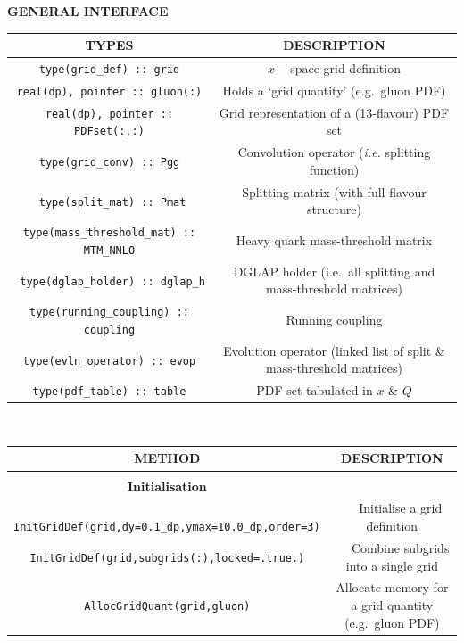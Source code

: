\documentclass[12pt]{article}
\newcommand{\eg}{e.g.\ }
\newcommand{\ie}{i.e.\ }
\begin{document}
\begin{table}
\scriptsize
\begin{center}
{\bf \large GENERAL INTERFACE} \\
\vspace{0.5cm} 
\begin{tabular}{|c|c|}
\hline
\bf TYPES  & \bf DESCRIPTION \\
\hline
\texttt{type(grid\_def) :: grid} & $x-$space grid definition \\ 
\hline
\texttt{real(dp), pointer :: gluon(:)} & Holds a 
`grid quantity' (\eg gluon PDF) \\
\hline
\texttt{real(dp), pointer :: PDFset(:,:)} & 
Grid representation of a (13-flavour) PDF set \\
\hline
\texttt{type(grid\_conv) :: Pgg} 
 & Convolution operator ({\it i.e.} splitting function) \\ 
\hline
\texttt{ type(split\_mat) :: Pmat}
 & Splitting matrix (with full flavour structure)\\ 
\hline
 \texttt{type(mass\_threshold\_mat) :: MTM\_NNLO}
 & Heavy quark mass-threshold matrix\\ 
\hline
\texttt{ type(dglap\_holder) :: dglap\_h} & DGLAP holder (\ie all
splitting and mass-threshold matrices) \\
\hline
\texttt{type(running\_coupling) :: coupling} & Running coupling \\
\hline
\texttt{type(evln\_operator) :: evop} & Evolution operator (linked
list of split \& mass-threshold matrices)\\
\hline
\texttt{type(pdf\_table) :: table} & PDF set tabulated in $x$ \& $Q$\\
\hline
\end{tabular}
\vspace{0.7cm}\\
\begin{tabular}{|c|c|}
\hline
\bf METHOD  & \bf DESCRIPTION \\
\hline &\\[-0.5em]
\bf Initialisation & \\[0.3em]
\hline
\texttt{
 InitGridDef(grid,dy=0.1\_dp,ymax=10.0\_dp,order=3)
}
 &
~ ~Initialise a grid definition \\
\hline
\texttt{
InitGridDef(grid,subgrids(:),locked=.true.)
}
 &
~ ~Combine subgrids into a single grid \\
\hline
\texttt{
 AllocGridQuant(grid,gluon)
} 
 &
Allocate memory for a grid quantity (\eg gluon PDF) \\

\end{tabular}
\end{center}
\end{table}
\end{document}

